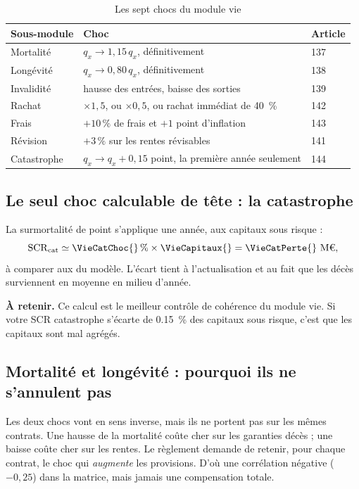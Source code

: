 \documentclass[11pt,a4paper]{article}
\newcommand{\astuce}[1]{\par\smallskip\noindent\textcolor{vertfonce}{\textbf{À retenir.}} #1\par\smallskip}
\newcommand{\Meuro}{\text{M\texteuro}}
\begin{document}
\begin{table}[h]\centering\small
\caption{Les sept chocs du module vie}
\begin{tabularx}{\linewidth}{lXl}
\toprule
Sous-module & Choc & Article\\
\midrule
Mortalité & $q_x \rightarrow 1{,}15\,q_x$, définitivement & 137\\
Longévité & $q_x \rightarrow 0{,}80\,q_x$, définitivement & 138\\
Invalidité & hausse des entrées, baisse des sorties & 139\\
Rachat & $\times 1{,}5$, ou $\times 0{,}5$, ou rachat immédiat de \qty{40}{\percent} & 142\\
Frais & $+10\,\%$ de frais et $+1$ point d'inflation & 143\\
Révision & $+3\,\%$ sur les rentes révisables & 141\\
Catastrophe & $q_x \rightarrow q_x + 0{,}15$ point, la première année seulement & 144\\
\bottomrule
\end{tabularx}
\end{table}

\subsection{Le seul choc calculable de tête : la catastrophe}

La surmortalité de \VieCatChoc{} point s'applique une année, aux capitaux sous risque :
\[
\mathrm{SCR}_{\text{cat}} \simeq \VieCatChoc{}\,\% \times \VieCapitaux{} = \VieCatPerte{}~\Meuro{},
\]
à comparer aux \VieCatModele{} \Meuro{} du modèle. L'écart tient à l'actualisation et au fait que
les décès surviennent en moyenne en milieu d'année.

\astuce{Ce calcul est le meilleur contrôle de cohérence du module vie. Si votre SCR catastrophe
s'écarte de \qty{0.15}{\percent} des capitaux sous risque, c'est que les capitaux sont mal
agrégés.}

\subsection{Mortalité et longévité : pourquoi ils ne s'annulent pas}

Les deux chocs vont en sens inverse, mais ils ne portent pas sur les mêmes contrats. Une hausse
de la mortalité coûte cher sur les garanties décès ; une baisse coûte cher sur les rentes.
Le règlement demande de retenir, pour chaque contrat, le choc qui \emph{augmente} les provisions.
D'où une corrélation négative ($-0{,}25$) dans la matrice, mais jamais une compensation totale.
\end{document}
